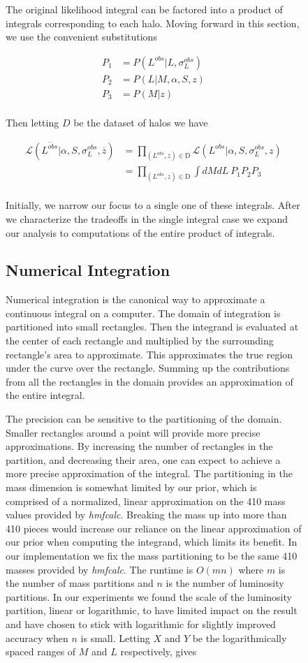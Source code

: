 \documentclass[\docopts]{\docclass}
\begin{document}
\begin{figure}[h!]
The original likelihood integral can be factored into a product of integrals corresponding to each halo. Moving forward in this section, we use the convenient substitutions

\begin{align*}
P_1 &= P(L^{obs}|L, \sigma_L^{obs})\\
P_2 &= P(L|M, \alpha, S, z)\\
P_3 &= P(M|z)\\
\end{align*}

\nonident Then letting $D$ be the dataset of halos we have

\begin{align*}
\mathcal{L}(\overline{L^{obs}}|\alpha, S, \sigma_L^{obs}, \overline{z}) &= \prod_{(L^{obs}, z) \in \text{D}}\mathcal{L}(L^{obs}|\alpha, S, \sigma_L^{obs}, z)\\
&= \prod_{(L^{obs}, z) \in \text{D}}\int dMdL\ P_1P_2P_3\\
\end{align*}

Initially, we narrow our focus to a single one of these integrals. 
After we characterize the tradeoffs in the single integral case we expand our analysis to computations of the entire product of integrals. 

\subsection{Numerical Integration}
\label{subsec:numint}

Numerical integration is the canonical way to approximate a continuous integral on a computer.
The domain of integration is partitioned into small rectangles.
Then the integrand is evaluated at the center of each rectangle and multiplied by the surrounding rectangle's area to approximate.
This approximates the true region under the curve over the rectangle.
Summing up the contributions from all the rectangles in the domain provides an approximation of the entire integral.

The precision can be sensitive to the partitioning of the domain. 
Smaller rectangles around a point will provide more precise approximations. 
By increasing the number of rectangles in the partition, and decreasing their area, one can expect to achieve a more precise approximation of the integral.
The partitioning in the mass dimension is somewhat limited by our prior, which is comprised of a normalized, linear approximation on the 410 mass values provided by \emph{hmfcalc}.
Breaking the mass up into more than 410 pieces would increase our reliance on the linear approximation of our prior when computing the integrand, which limits its benefit.
In our implementation we fix the mass partitioning to be the same 410 masses provided by \emph{hmfcalc}.
The runtime is $O(mn)$ where $m$ is the number of mass partitions and $n$ is the number of luminosity partitions.
In our experiments we found the scale of the luminosity partition, linear or logarithmic, to have limited impact on the result and have chosen to stick with logarithmic for slightly improved accuracy when $n$ is small.
Letting $X$ and $Y$ be the logarithmically spaced ranges of $M$ and $L$ respectively, gives


\end{figure}
\end{document}
